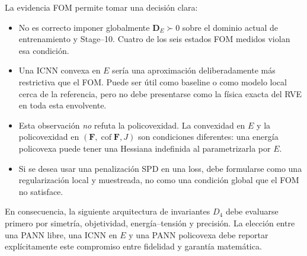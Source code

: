 \documentclass[11pt,a4paper]{article}
\begin{document}
La evidencia FOM permite tomar una decisión clara:
\begin{itemize}
 \item No es correcto imponer globalmente $\bm D_E\succ0$ sobre el dominio
 actual de entrenamiento y Stage--10. Cuatro de los seis estados FOM
 medidos violan esa condición.
 \item Una ICNN convexa en $E$ sería una aproximación deliberadamente más
 restrictiva que el FOM. Puede ser útil como baseline o como modelo local cerca
 de la referencia, pero no debe presentarse como la física exacta del RVE en
 toda esta envolvente.
 \item Esta observación \emph{no} refuta la policovexidad. La convexidad en
 $E$ y la policovexidad en $(\bm F,\operatorname{cof}\bm F,J)$ son condiciones
 diferentes: una energía policovexa puede tener una Hessiana indefinida al
 parametrizarla por $E$.
 \item Si se desea usar una penalización SPD en una loss, debe formularse como
 una regularización local y muestreada, no como una condición global que el FOM
 no satisface.
\end{itemize}

En consecuencia, la siguiente arquitectura de invariantes $D_4$ debe evaluarse
primero por simetría, objetividad, energía--tensión y precisión. La elección
entre una PANN libre, una ICNN en $E$ y una PANN policovexa debe reportar
explícitamente este compromiso entre fidelidad y garantía matemática.
\end{document}
